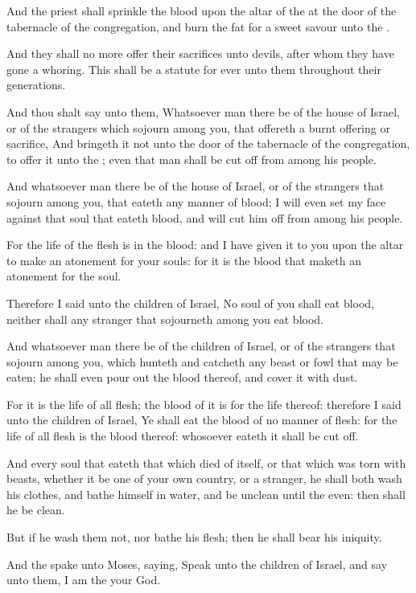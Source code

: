 \Verse And the priest shall sprinkle the blood upon the altar of the \LORD at the door of the tabernacle of the congregation, and burn the fat for a sweet savour unto the \LORD.

\Verse And they shall no more offer their sacrifices unto devils, after whom they have gone a whoring. This shall be a statute for ever unto them throughout their generations.

\Verse And thou shalt say unto them, Whatsoever man there be of the house of Israel, or of the strangers which sojourn among you, that offereth a burnt offering or sacrifice, \Verse And bringeth it not unto the door of the tabernacle of the congregation, to offer it unto the \LORD; even that man shall be cut off from among his people.

\Verse And whatsoever man there be of the house of Israel, or of the strangers that sojourn among you, that eateth any manner of blood; I will even set my face against that soul that eateth blood, and will cut him off from among his people.

\Verse For the life of the flesh is in the blood: and I have given it to you upon the altar to make an atonement for your souls: for it is the blood that maketh an atonement for the soul.

\Verse Therefore I said unto the children of Israel, No soul of you shall eat blood, neither shall any stranger that sojourneth among you eat blood.

\Verse And whatsoever man there be of the children of Israel, or of the strangers that sojourn among you, which hunteth and catcheth any beast or fowl that may be eaten; he shall even pour out the blood thereof, and cover it with dust.

\Verse For it is the life of all flesh; the blood of it is for the life thereof: therefore I said unto the children of Israel, Ye shall eat the blood of no manner of flesh: for the life of all flesh is the blood thereof: whosoever eateth it shall be cut off.

\Verse And every soul that eateth that which died of itself, or that which was torn with beasts, whether it be one of your own country, or a stranger, he shall both wash his clothes, and bathe himself in water, and be unclean until the even: then shall he be clean.

\Verse But if he wash them not, nor bathe his flesh; then he shall bear his iniquity.

\Chapter
\Verse And the \LORD spake unto Moses, saying, \Verse Speak unto the children of Israel, and say unto them, I am the \LORD your God.

